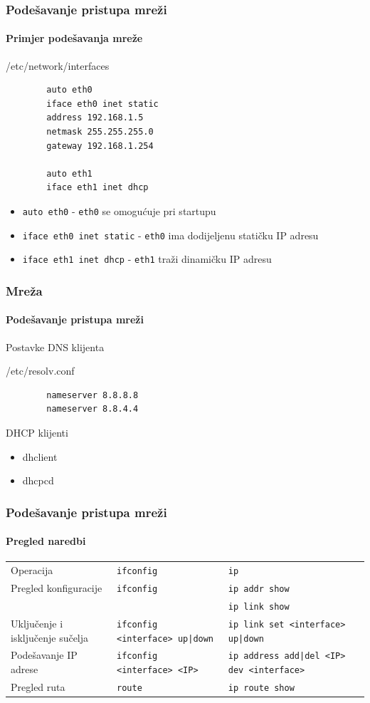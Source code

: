 \documentclass[table,usenames,dvipsnames]{beamer}
\newcommand{\shell}[1]{\texttt{#1}}
\begin{document}
\begin{frame}[fragile]
	\frametitle{Podešavanje pristupa mreži}
	\framesubtitle{Primjer podešavanja mreže}
	\begin{block}{/etc/network/interfaces}
		\ttfamily
		\begin{verbatim}
		auto eth0
		iface eth0 inet static
		address 192.168.1.5
		netmask 255.255.255.0
		gateway 192.168.1.254
		
		auto eth1
		iface eth1 inet dhcp
		\end{verbatim}
	\end{block}
	\begin{itemize}
		\item \shell{auto eth0} - \shell{eth0} se omogućuje pri startupu
		\item \shell{iface eth0 inet static} - \shell{eth0} ima dodijeljenu statičku IP adresu
		\item \shell{iface eth1 inet dhcp} - \shell{eth1} traži dinamičku IP adresu
	\end{itemize}
\end{frame}

\begin{frame}[fragile]
	\frametitle{Mreža}
	\framesubtitle{Podešavanje pristupa mreži}
	
	Postavke DNS klijenta
	\begin{block}{/etc/resolv.conf}
		\ttfamily
		\begin{verbatim}
		nameserver 8.8.8.8
		nameserver 8.8.4.4
		\end{verbatim}
	\end{block}
	
	\vfill
	
	DHCP klijenti
	\begin{itemize}
		\item dhclient
		\item dhcpcd
	\end{itemize}
\end{frame}

\begin{frame}[t]
	\frametitle{Podešavanje pristupa mreži}
	\framesubtitle{Pregled naredbi}
	\begin{table}[h]
		\begin{tabular}{p{4cm} p{3cm} p{3cm}}
			\rowcolor{BlueViolet!20}Operacija & \shell{ifconfig} & \shell{ip} \\
			Pregled konfiguracije & \shell{ifconfig} & \shell{ip addr show} \\ & & \shell{ip link show} \\
			Uključenje i isključenje sučelja & \shell{ifconfig <interface> up|down} & \shell{ip link set <interface> up|down} \\
			Podešavanje IP adrese & \shell{ifconfig <interface> <IP>} & \shell{ip address add|del <IP> dev <interface>} \\
			Pregled ruta & \shell{route} & \shell{ip route show}
		\end{tabular}
	\end{table}
\end{frame}
\end{document}
